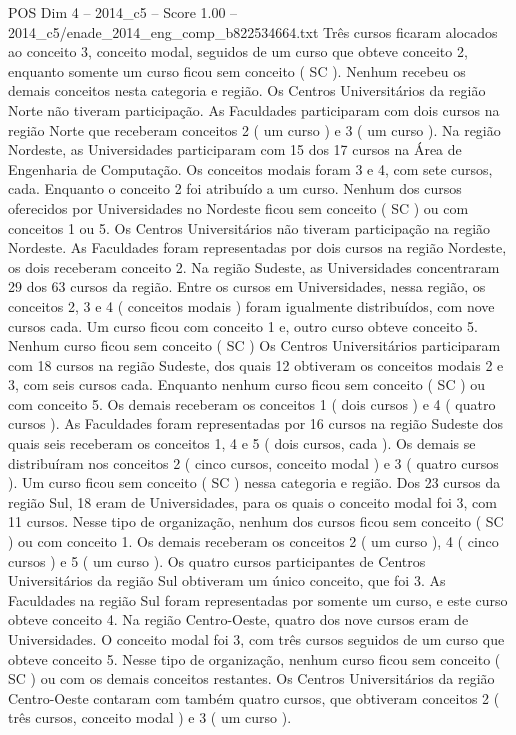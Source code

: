 \begin{textsample}{POS Dim 4 – 2014\_c5 – Score 1.00 – 2014\_c5/enade\_2014\_eng\_comp\_b822534664.txt}
Três cursos ficaram alocados ao conceito 3, conceito modal, seguidos de um curso que obteve conceito 2, enquanto somente um curso ficou sem conceito ( SC ).
Nenhum recebeu os demais conceitos nesta categoria e região.
Os Centros Universitários da região Norte não tiveram participação.
As Faculdades participaram com dois cursos na região Norte que receberam conceitos 2 ( um curso ) e 3 ( um curso ).
Na região Nordeste, as Universidades participaram com 15 dos 17 cursos na Área de Engenharia de Computação.
Os conceitos modais foram 3 e 4, com sete cursos, cada.
Enquanto o conceito 2 foi atribuído a um curso.
Nenhum dos cursos oferecidos por Universidades no Nordeste ficou sem conceito ( SC ) ou com conceitos 1 ou 5.
Os Centros Universitários não tiveram participação na região Nordeste.
As Faculdades foram representadas por dois cursos na região Nordeste, os dois receberam conceito 2.
Na região Sudeste, as Universidades concentraram 29 dos 63 cursos da região.
Entre os cursos em Universidades, nessa região, os conceitos 2, 3 e 4 ( conceitos modais ) foram igualmente distribuídos, com nove cursos cada.
Um curso ficou com conceito 1 e, outro curso obteve conceito 5.
Nenhum curso ficou sem conceito ( SC ) Os Centros Universitários participaram com 18 cursos na região Sudeste, dos quais 12 obtiveram os conceitos modais 2 e 3, com seis cursos cada.
Enquanto nenhum curso ficou sem conceito ( SC ) ou com conceito 5.
Os demais receberam os conceitos 1 ( dois cursos ) e 4 ( quatro cursos ).
As Faculdades foram representadas por 16 cursos na região Sudeste dos quais seis receberam os conceitos 1, 4 e 5 ( dois cursos, cada ).
Os demais se distribuíram nos conceitos 2 ( cinco cursos, conceito modal ) e 3 ( quatro cursos ).
Um curso ficou sem conceito ( SC ) nessa categoria e região.
Dos 23 cursos da região Sul, 18 eram de Universidades, para os quais o conceito modal foi 3, com 11 cursos.
Nesse tipo de organização, nenhum dos cursos ficou sem conceito ( SC ) ou com conceito 1.
Os demais receberam os conceitos 2 ( um curso ), 4 ( cinco cursos ) e 5 ( um curso ).
Os quatro cursos participantes de Centros Universitários da região Sul obtiveram um único conceito, que foi 3.
As Faculdades na região Sul foram representadas por somente um curso, e este curso obteve conceito 4.
Na região Centro-Oeste, quatro dos nove cursos eram de Universidades.
O conceito modal foi 3, com três cursos seguidos de um curso que obteve conceito 5.
Nesse tipo de organização, nenhum curso ficou sem conceito ( SC ) ou com os demais conceitos restantes.
Os Centros Universitários da região Centro-Oeste contaram com também quatro cursos, que obtiveram conceitos 2 ( três cursos, conceito modal ) e 3 ( um curso ).

\end{textsample}
